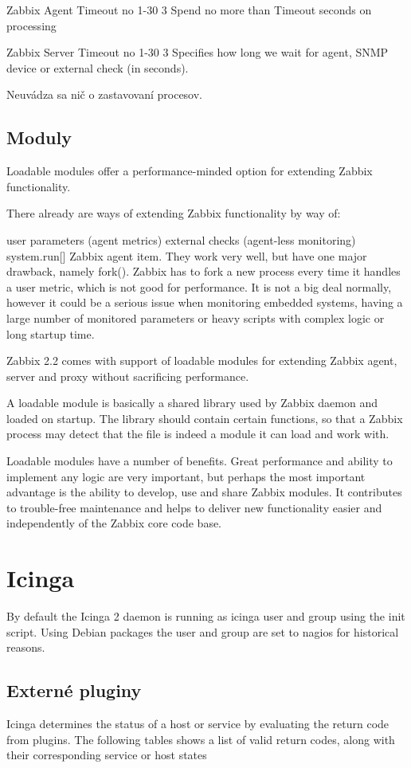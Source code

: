 \documentclass[11pt,final,oneside]{fithesis}
\begin{document}
Zabbix Agent
Timeout	 no	 1-30	3	Spend no more than Timeout seconds on processing
\cite{20}

Zabbix Server
Timeout	 no	 1-30	3	Specifies how long we wait for agent, SNMP device or external check (in seconds).
\cite{05}

Neuvádza sa nič o zastavovaní procesov.
\subsection{Moduly}

Loadable modules offer a performance-minded option for extending Zabbix functionality.

There already are ways of extending Zabbix functionality by way of:

user parameters (agent metrics)
external checks (agent-less monitoring)
system.run[] Zabbix agent item.
They work very well, but have one major drawback, namely fork(). Zabbix has to fork a new process every time it handles a user metric, which is not good for performance. It is not a big deal normally, however it could be a serious issue when monitoring embedded systems, having a large number of monitored parameters or heavy scripts with complex logic or long startup time.

Zabbix 2.2 comes with support of loadable modules for extending Zabbix agent, server and proxy without sacrificing performance.

A loadable module is basically a shared library used by Zabbix daemon and loaded on startup. The library should contain certain functions, so that a Zabbix process may detect that the file is indeed a module it can load and work with.

Loadable modules have a number of benefits. Great performance and ability to implement any logic are very important, but perhaps the most important advantage is the ability to develop, use and share Zabbix modules. It contributes to trouble-free maintenance and helps to deliver new functionality easier and independently of the Zabbix core code base.
\cite{06}

\section{Icinga}
By default the Icinga 2 daemon is running as icinga user and group using the init script. Using Debian packages the user and group are set to nagios for historical reasons.
\cite{07}

\subsection{Externé pluginy}
Icinga determines the status of a host or service by evaluating the return code from plugins. The following tables shows a list of valid return codes, along with their corresponding service or host states
\cite{08}
\end{document}
